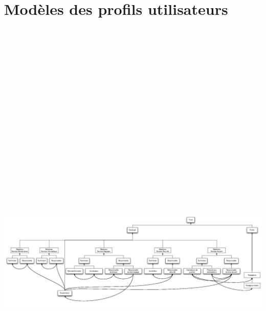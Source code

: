 \part{Modèles des profils utilisateurs}
\begin{center}
    \includegraphics[angle=90, height=24cm]{../../MU/src/img/MU.png}
\end{center}
\newpage
